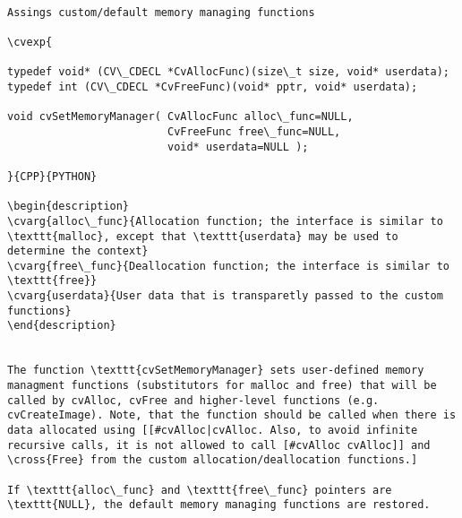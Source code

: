 \begin{verbatim}

Assings custom/default memory managing functions

\cvexp{

typedef void* (CV\_CDECL *CvAllocFunc)(size\_t size, void* userdata);
typedef int (CV\_CDECL *CvFreeFunc)(void* pptr, void* userdata);

void cvSetMemoryManager( CvAllocFunc alloc\_func=NULL,
                         CvFreeFunc free\_func=NULL,
                         void* userdata=NULL );

}{CPP}{PYTHON}

\begin{description}
\cvarg{alloc\_func}{Allocation function; the interface is similar to \texttt{malloc}, except that \texttt{userdata} may be used to determine the context}
\cvarg{free\_func}{Deallocation function; the interface is similar to \texttt{free}}
\cvarg{userdata}{User data that is transparetly passed to the custom functions}
\end{description}


The function \texttt{cvSetMemoryManager} sets user-defined memory managment functions (substitutors for malloc and free) that will be called by cvAlloc, cvFree and higher-level functions (e.g. cvCreateImage). Note, that the function should be called when there is data allocated using [[#cvAlloc|cvAlloc. Also, to avoid infinite recursive calls, it is not allowed to call [#cvAlloc cvAlloc]] and \cross{Free} from the custom allocation/deallocation functions.]

If \texttt{alloc\_func} and \texttt{free\_func} pointers are \texttt{NULL}, the default memory managing functions are restored.


\end{verbatim}
